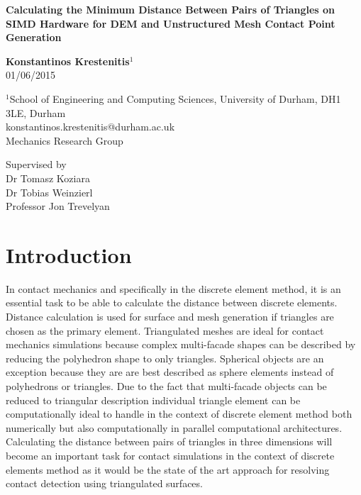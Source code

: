 \documentclass[times,12pt]{ACME2015article}
\begin{document}
\pagestyle{plain}

\begin{center}
{\fontsize{22}{20}\bf Calculating the Minimum Distance Between Pairs of Triangles on SIMD Hardware for DEM and Unstructured Mesh Contact Point Generation\\
}\end{center}

\vspace{\fill}
\begin{center}\fontsize{16}{20}
\textbf{Konstantinos Krestenitis$^1$}\\
01/06/2015
\end{center}
\vspace{\fill}

\begin{center}
{\fontsize{10}{12}
}\end{center}


\begin{center}
$^1$School of Engineering and Computing Sciences, University of Durham, DH1 3LE, Durham\\
konstantinos.krestenitis@durham.ac.uk\\
Mechanics Research Group\\
\end{center}
\begin{center}
Supervised by\\
Dr Tomasz Koziara\\
Dr Tobias Weinzierl\\
Professor Jon Trevelyan\\
\end{center}

\clearpage

\tableofcontents

\clearpage

\section{Introduction}
In contact mechanics and specifically in the discrete element method, it is an essential task to be able to calculate the distance between discrete elements. Distance calculation is used for surface and mesh generation if triangles are chosen as the primary element. Triangulated meshes are ideal for contact mechanics simulations because complex multi-facade shapes can be described by reducing the polyhedron shape to only triangles. Spherical objects are an exception because they are are best described as sphere elements instead of polyhedrons or triangles. Due to the fact that multi-facade objects can be reduced to triangular description individual triangle element can be computationally ideal to handle in the context of discrete element method both numerically but also computationally in parallel computational architectures. Calculating the distance between pairs of triangles in three dimensions will become an important task for contact simulations in the context of discrete elements method as it would be the state of the art approach for resolving contact detection using triangulated surfaces.
\end{document}
